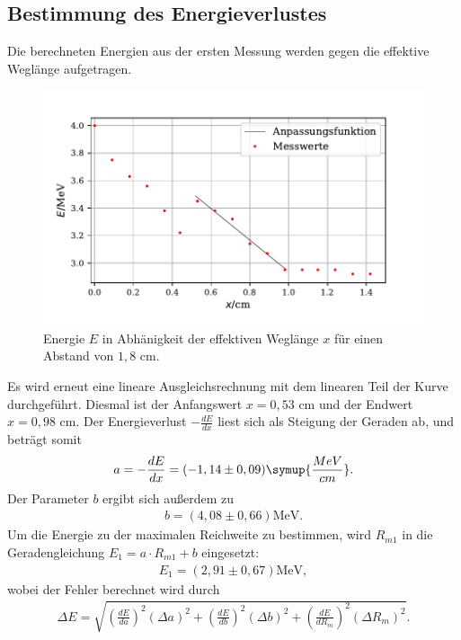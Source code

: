 \subsection{Bestimmung des Energieverlustes}
Die berechneten Energien aus der ersten Messung werden gegen die effektive Weglänge aufgetragen. 
\begin{figure}[H]
  \centering
  \includegraphics{plot3.pdf}
  \caption{Energie $E$ in Abhänigkeit der effektiven Weglänge $x$ für einen Abstand von $1,8$ $\si{\cm}$. }
  \label{fig:plot}
\end{figure}
\noindent Es wird erneut eine lineare Ausgleichsrechnung mit dem linearen Teil der Kurve durchgeführt. Diesmal ist der Anfangswert $x=0,53$ $\si{\cm}$ und der Endwert $x=0,98$ $\si{\cm}$.  Der Energieverlust $-\frac{dE}{dx}$
liest sich als Steigung der Geraden ab, und beträgt somit
\begin{align*}
a = -\frac{dE}{dx} = (-1,14 \pm 0,09) \symup{\frac{MeV}{cm}} .
\end{align*}
Der Parameter $b$ ergibt sich außerdem zu
\begin{align*}
b = (4,08 \pm 0,66) \si{\MeV}.
\end{align*}
Um die Energie zu der maximalen Reichweite zu bestimmen, wird $R_{m1}$ in die Geradengleichung $E_1 = a \cdot R_{m1} + b$ eingesetzt:
\begin{align*}
E_1 = (2,91 \pm 0,67) \si{\MeV}, %
\end{align*}
wobei der Fehler berechnet wird durch
\begin{align*}
\Delta E = \sqrt{(\frac{dE}{da})^2 (\Delta a)^2 + (\frac{dE}{db})^2 (\Delta b)^2 + (\frac{dE}{dR_m})^2 (\Delta R_m)^2}.
\end{align*}


